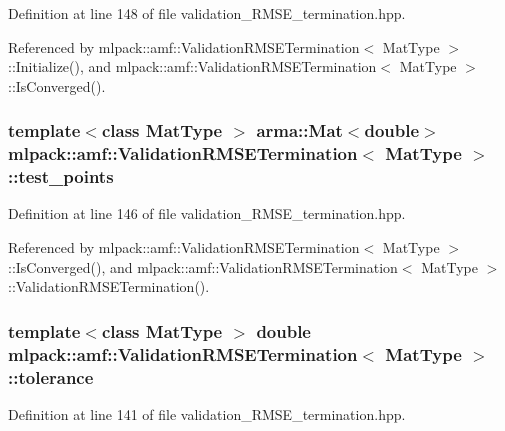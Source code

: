 Definition at line 148 of file validation\-\_\-\-R\-M\-S\-E\-\_\-termination.\-hpp.



Referenced by mlpack\-::amf\-::\-Validation\-R\-M\-S\-E\-Termination$<$ Mat\-Type $>$\-::\-Initialize(), and mlpack\-::amf\-::\-Validation\-R\-M\-S\-E\-Termination$<$ Mat\-Type $>$\-::\-Is\-Converged().

\subsubsection[{test\-\_\-points}]{\setlength{\rightskip}{0pt plus 5cm}template$<$class Mat\-Type $>$ arma\-::\-Mat$<$double$>$ {\bf mlpack\-::amf\-::\-Validation\-R\-M\-S\-E\-Termination}$<$ Mat\-Type $>$\-::test\-\_\-points\hspace{0.3cm}{\ttfamily [private]}}\label{classmlpack_1_1amf_1_1ValidationRMSETermination_a626a6619cd7388888b7b410779dddd64}


Definition at line 146 of file validation\-\_\-\-R\-M\-S\-E\-\_\-termination.\-hpp.



Referenced by mlpack\-::amf\-::\-Validation\-R\-M\-S\-E\-Termination$<$ Mat\-Type $>$\-::\-Is\-Converged(), and mlpack\-::amf\-::\-Validation\-R\-M\-S\-E\-Termination$<$ Mat\-Type $>$\-::\-Validation\-R\-M\-S\-E\-Termination().

\subsubsection[{tolerance}]{\setlength{\rightskip}{0pt plus 5cm}template$<$class Mat\-Type $>$ double {\bf mlpack\-::amf\-::\-Validation\-R\-M\-S\-E\-Termination}$<$ Mat\-Type $>$\-::tolerance\hspace{0.3cm}{\ttfamily [private]}}\label{classmlpack_1_1amf_1_1ValidationRMSETermination_a8c24c251ad318a5ebd84500e3f685813}


Definition at line 141 of file validation\-\_\-\-R\-M\-S\-E\-\_\-termination.\-hpp.

